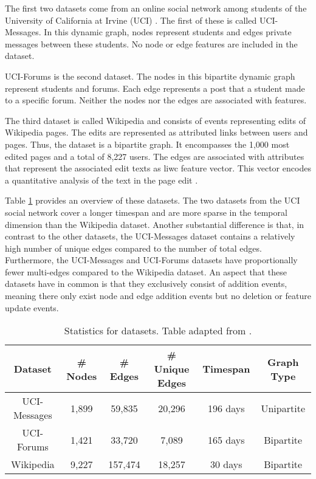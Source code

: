 The first two datasets come from an online social network among students of the University of California at Irvine (UCI) \cite{kunegis_konect_2013}. The first of these is called UCI-Messages. In this dynamic graph, nodes represent students and edges private messages between these students. No node or edge features are included in the dataset. 

UCI-Forums is the second dataset. The nodes in this bipartite dynamic graph represent students and forums. Each edge represents a post that a student made to a specific forum. Neither the nodes nor the edges are associated with features.

The third dataset is called Wikipedia \cite{kumar_predicting_2019} and consists of events representing edits of Wikipedia pages. The edits are represented as attributed links between users and pages. Thus, the dataset is a bipartite graph. It encompasses the 1,000 most edited pages and a total of 8,227 users. The edges are associated with attributes that represent the associated edit texts as \gls{liwc} \cite{pennebaker_linguistic_2001} feature vector. This vector encodes a quantitative analysis of the text in the page edit \cite{pennebaker_linguistic_2001}.

\vspace{0.5cm}

Table \ref{t_Datasets} provides an overview of these datasets. The two datasets from the UCI social network cover a longer timespan and are more sparse in the temporal dimension than the Wikipedia dataset. Another substantial difference is that, in contrast to the other datasets, the UCI-Messages dataset contains a relatively high number of unique edges compared to the number of total edges. 
Furthermore, the UCI-Messages and UCI-Forums datasets have proportionally fewer multi-edges compared to the Wikipedia dataset. An aspect that these datasets have in common is that they exclusively consist of addition events, meaning there only exist node and edge addition events but no deletion or feature update events.

\begin{table}[ht]
    \centering
    \begin{tabular}{cccccc}
        \hline
         Dataset&  \# Nodes&  \# Edges&  \# Unique Edges& Timespan & Graph Type\\
         \hline
         UCI-Messages \cite{kunegis_konect_2013} & 1,899 & 59,835 & 20,296 &196 days & Unipartite\\
        UCI-Forums \cite{kunegis_konect_2013}& 1,421& 33,720& 7,089&165 days& Bipartite\\
        Wikipedia \cite{kumar_predicting_2019}& 9,227& 157,474& 18,257&30 days& Bipartite\\
        \hline
    \end{tabular}
    \caption{Statistics for datasets. Table adapted from \cite{poursafaei_towards_2022}.}
    \label{t_Datasets}
\end{table}



